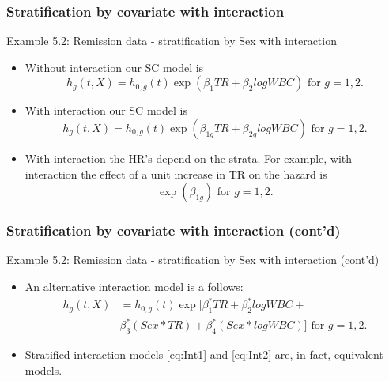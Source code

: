 \documentclass{beamer}
\theoremstyle{definition}
\begin{document}
\begin{frame}
\frametitle{Stratification by covariate with interaction}
\begin{block}{Example 5.2: Remission data - stratification by Sex with interaction}
\begin{itemize}
\item Without interaction our SC model is
\[
h_g(t,X) = h_{0,g}(t)\exp(\beta_1 TR + \beta_2 logWBC) \text{ for } g=1,2.
\]
\item With interaction our SC model is
\begin{equation} \label{eq:Int1}
h_g(t,X) = h_{0,g}(t)\exp(\beta_{1g} TR + \beta_{2g} logWBC) \text{ for } g=1,2.
\end{equation}
\item With interaction the HR's depend on the strata. For example, with interaction the effect of a unit increase in TR on the hazard is
\[
\exp(\beta_{1g}) \text{ for } g=1,2.
\]
\end{itemize}
\end{block}
\end{frame}

\begin{frame}
\frametitle{Stratification by covariate with interaction (cont'd)}
\begin{block}{Example 5.2: Remission data - stratification by Sex with interaction (cont'd)}
\begin{itemize}
\item An alternative interaction model is a follows:
\begin{equation}\label{eq:Int2}
\begin{aligned}
h_g(t,X) & = h_{0,g}(t)\exp[\beta_1^* TR + \beta_2^* logWBC +  \\
& \beta_3^*(Sex*TR) + \beta_4^*(Sex*logWBC) ] \text{ for } g=1,2.
\end{aligned}
\end{equation}
\item Stratified interaction models \eqref{eq:Int1} and \eqref{eq:Int2} are, in fact, equivalent models.
\end{itemize}
\end{block}
\end{frame}
\end{document}
